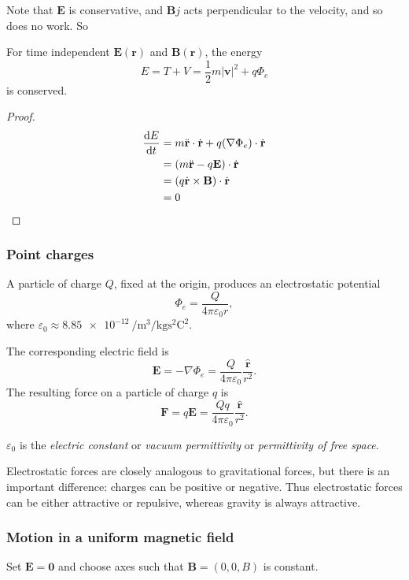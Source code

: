 \documentclass[a4paper]{article}
\begin{document}
Note that $\mathbf{E}$ is conservative, and $\mathbf{B}j$ acts perpendicular to the velocity, and so does no work. So
\begin{prop}
  For time independent $\mathbf{E}(\mathbf{r})$ and $\mathbf{B}(\mathbf{r})$, the energy
  \[
    E = T + V = \frac{1}{2}m|\mathbf{v}|^2 + q\Phi_e
  \]
  is conserved.
\end{prop}

\begin{proof}
  \begin{align*}
    \frac{\mathrm{d} E}{\mathrm{d} t} &= m\ddot{\mathbf{r}}\cdot \dot{\mathbf{r}} + q(\nabla \Phi_e)\cdot \dot{\mathbf{r}}\\
    &= (m\ddot{\mathbf{r}} - q\mathbf{E}) \cdot \dot{\mathbf{r}}\\
    &= (q\dot{\mathbf{r}}\times \mathbf{B})\cdot \dot{\mathbf{r}}\\
    &= 0
  \end{align*}
\end{proof}

\subsubsection{Point charges}
\begin{law}
  A particle of charge $Q$, fixed at the origin, produces an electrostatic potential
  \[
    \Phi_e = \frac{Q}{4\pi\varepsilon_0 r},
  \]
  where $\varepsilon_0 \approx \SI{8.85e-12}{\per\meter\cubed\per\kilogram\second\squared\coulomb\squared}$.

  The corresponding electric field is 
  \[
    \mathbf{E} = -\nabla \Phi_e = \frac{Q}{4\pi\varepsilon_0} \frac{\hat{\mathbf{r}}}{r^2}.
  \]
  The resulting force on a particle of charge $q$ is
  \[
    \mathbf{F} = q\mathbf{E} = \frac{Qq}{4\pi\varepsilon_0}\frac{\hat{\mathbf{r}}}{r^2}.
  \]
\end{law}
\begin{defi}
  $\varepsilon_0$ is the \emph{electric constant} or \emph{vacuum permittivity} or \emph{permittivity of free space}.
\end{defi}

Electrostatic forces are closely analogous to gravitational forces, but there is an important difference: charges can be positive or negative. Thus electrostatic forces can be either attractive or repulsive, whereas gravity is always attractive.

\subsubsection{Motion in a uniform magnetic field}
Set $\mathbf{E} = \mathbf{0}$ and choose axes such that $\mathbf{B} = (0, 0, B)$ is constant.
\end{document}

